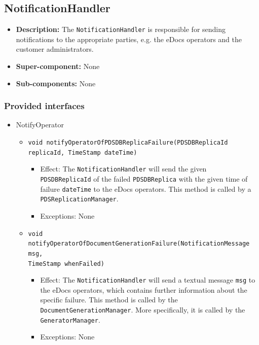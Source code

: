 \documentclass[a4paper,10pt]{article}
\begin{document}
\subsection{NotificationHandler}
\begin{itemize}
    \item \textbf{Description:} The \texttt{NotificationHandler} is responsible for sending notifications to the appropriate parties, e.g. the eDocs operators and the customer administrators.
    \item \textbf{Super-component:} None
    \item \textbf{Sub-components:} None
\end{itemize}

\subsubsection*{Provided interfaces}
\begin{itemize}
    \item NotifyOperator
    \begin{itemize}
        \item \texttt{void notifyOperatorOfPDSDBReplicaFailure(PDSDBReplicaId replicaId, TimeStamp dateTime)}
        \begin{itemize}
            \item Effect: The \texttt{NotificationHandler} will send the given \texttt{PDSDBReplicaId} of the failed \texttt{PDSDBReplica} with the given time of failure \texttt{dateTime} to the eDocs operators. This method is called by a \texttt{PDSReplicationManager}.
            \item Exceptions: None
        \end{itemize}
        
        \item \texttt{void notifyOperatorOfDocumentGenerationFailure(NotificationMessage msg,\\ TimeStamp whenFailed)}
        \begin{itemize}
            \item Effect: The \texttt{NotificationHandler} will send a textual message \texttt{msg} to the eDocs operators, which contains further information about the specific failure. This method is called by the \texttt{DocumentGenerationManager}. More specifically, it is called by the \texttt{GeneratorManager}.
            \item Exceptions: None
        \end{itemize}
    \end{itemize}
\end{itemize}
\end{document}
